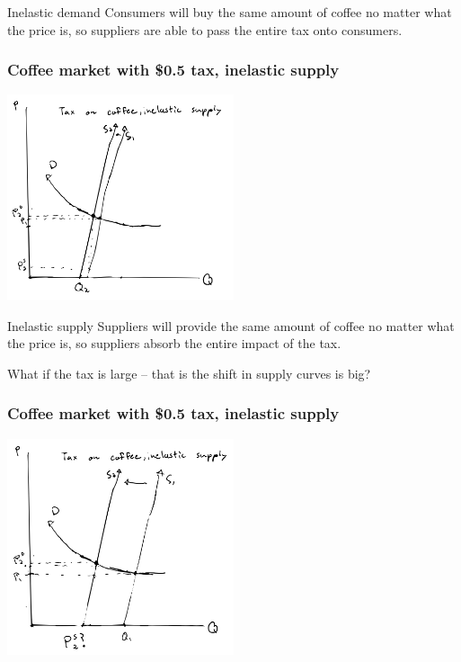 \documentclass[aspectratio=169]{beamer}
\begin{document}
\begin{frame}{Inelastic demand}
    Consumers will buy the same amount of coffee no matter what the price is, so suppliers are able to pass the entire tax onto consumers.
\end{frame}

\begin{frame}
    \frametitle{Coffee market with \$0.5 tax, inelastic supply}
    \centering
    \includegraphics[width = 0.5\textwidth,keepaspectratio]{coffee_tax_is1.png}
\end{frame}

\begin{frame}{Inelastic supply}
    Suppliers will provide the same amount of coffee no matter what the price is, so suppliers absorb the entire impact of the tax.

    \vspace{5mm}

    What if the tax is large -- that is the shift in supply curves is big?
\end{frame}

\begin{frame}
    \frametitle{Coffee market with \$0.5 tax, inelastic supply}
    \centering
    \includegraphics[width = 0.5\textwidth,keepaspectratio]{coffee_tax_is2.png}
\end{frame}
\end{document}

